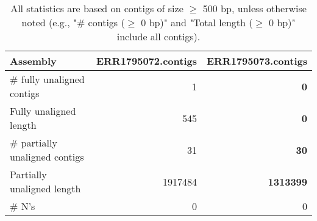 \documentclass[12pt,a4paper]{article}
\begin{document}
\begin{table}[ht]
\begin{center}
\caption{All statistics are based on contigs of size $\geq$ 500 bp, unless otherwise noted (e.g., "\# contigs ($\geq$ 0 bp)" and "Total length ($\geq$ 0 bp)" include all contigs).}
\begin{tabular}{|l*{2}{|r}|}
\hline
Assembly & ERR1795072.contigs & ERR1795073.contigs \\ \hline
\# fully unaligned contigs & 1 & {\bf 0} \\ \hline
Fully unaligned length & 545 & {\bf 0} \\ \hline
\# partially unaligned contigs & 31 & {\bf 30} \\ \hline
Partially unaligned length & 1917484 & {\bf 1313399} \\ \hline
\# N's & 0 & 0 \\ \hline
\end{tabular}
\end{center}
\end{table}
\end{document}
